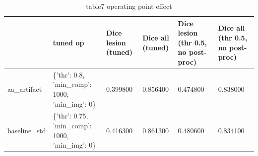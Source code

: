 \begin{table}
\caption{table7 operating point effect}
\label{tab:table7_operating_point_effect}
\begin{tabular}{llllll}
\toprule
 & tuned op & Dice lesion (tuned) & Dice all (tuned) & Dice lesion (thr 0.5, no post-proc) & Dice all (thr 0.5, no post-proc) \\
\midrule
aa\_artifact & \{'thr': 0.8, 'min\_comp': 1000, 'min\_img': 0\} & 0.399800 & 0.856400 & 0.474800 & 0.838000 \\
baseline\_std & \{'thr': 0.75, 'min\_comp': 1000, 'min\_img': 0\} & 0.416300 & 0.861300 & 0.480600 & 0.834100 \\
\bottomrule
\end{tabular}
\end{table}

